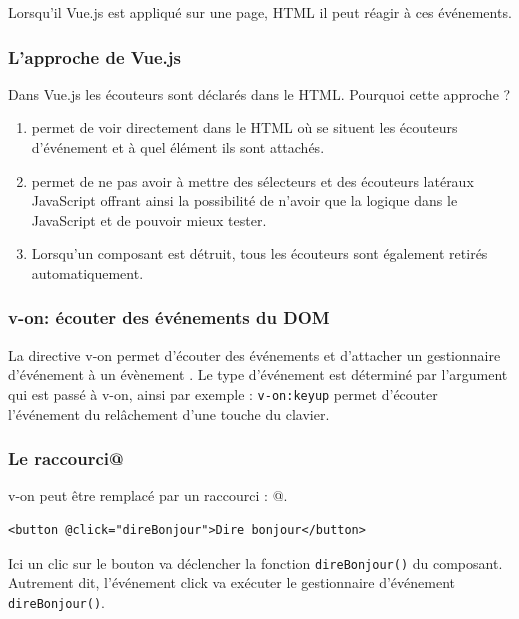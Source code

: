 \documentclass{article}
\begin{document}
Lorsqu'il {\color{monOrange}Vue.js} est appliqué sur une page, HTML il peut réagir à ces événements.

\subsubsection{L'approche de {\color{monOrange}Vue.js}}
Dans {\color{monOrange}Vue.js} les écouteurs sont déclarés dans le HTML. Pourquoi cette approche ?
\begin{enumerate}
\item  permet de voir directement dans le HTML où se situent les écouteurs d'événement et à quel élément ils sont attachés.
\item  permet de ne pas avoir à mettre des sélecteurs et des écouteurs latéraux JavaScript offrant ainsi la possibilité de n'avoir que la logique dans le JavaScript et de pouvoir mieux tester.
\item  Lorsqu'un composant est détruit, tous les écouteurs sont également retirés automatiquement.
\end{enumerate}

\subsubsection{{\color{monOrange}v-on}: écouter des événements du DOM}
La directive {\color{monOrange}v-on} permet d'écouter des événements et d'attacher un gestionnaire d'événement à un évènement . Le type d'événement est déterminé par l'argument qui est passé à {\color{monOrange}v-on}, ainsi par exemple : {\tt v-on:keyup} permet d'écouter l'événement du relâchement d'une touche du clavier.

\subsubsection{Le raccourci@}
{\color{monOrange}v-on} peut être remplacé par un raccourci : {\color{monOrange}@}.
\begin{verbatim}
<button @click="direBonjour">Dire bonjour</button>
\end{verbatim}

Ici un {\color{monOrange}clic} sur le bouton va déclencher la fonction {\tt direBonjour()} du composant. Autrement dit, l'événement {\color{monOrange}click} va exécuter le gestionnaire d'événement {\tt direBonjour()}.
\end{document}
